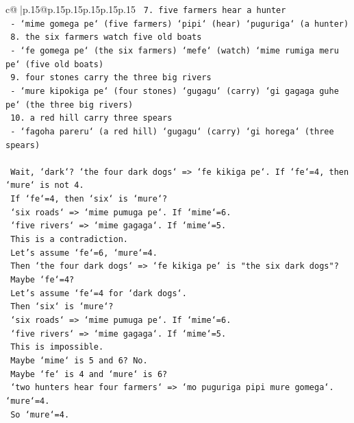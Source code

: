 \documentclass{article}
\begin{document}
{\begin{supertabular}{c@{$\;$}|p{.15\linewidth}@{}p{.15\linewidth}p{.15\linewidth}p{.15\linewidth}p{.15\linewidth}p{.15\linewidth}}
{{{\texttt{    7. five farmers hear a hunter} \\
\texttt{       {-} `mime gomega pe` (five farmers) `pipi` (hear) `puguriga` (a hunter)} \\
\texttt{    8. the six farmers watch five old boats} \\
\texttt{       {-} `fe gomega pe` (the six farmers) `mefe` (watch) `mime rumiga meru pe` (five old boats)} \\
\texttt{    9. four stones carry the three big rivers} \\
\texttt{       {-} `mure kipokiga pe` (four stones) `gugagu` (carry) `gi gagaga guhe pe` (the three big rivers)} \\
\texttt{    10. a red hill carry three spears} \\
\texttt{        {-} `fagoha pareru` (a red hill) `gugagu` (carry) `gi horega` (three spears)} \\
\\ 
\texttt{    Wait, `dark`? `the four dark dogs` => `fe kikiga pe`. If `fe`=4, then `mure` is not 4.} \\
\texttt{    If `fe`=4, then `six` is `mure`?} \\
\texttt{    `six roads` => `mime pumuga pe`. If `mime`=6.} \\
\texttt{    `five rivers` => `mime gagaga`. If `mime`=5.} \\
\texttt{    This is a contradiction.} \\
\texttt{    Let's assume `fe`=6, `mure`=4.} \\
\texttt{    Then `the four dark dogs` => `fe kikiga pe` is "the six dark dogs"?} \\
\texttt{    Maybe `fe`=4?} \\
\texttt{    Let's assume `fe`=4 for `dark dogs`.} \\
\texttt{    Then `six` is `mure`?} \\
\texttt{    `six roads` => `mime pumuga pe`. If `mime`=6.} \\
\texttt{    `five rivers` => `mime gagaga`. If `mime`=5.} \\
\texttt{    This is impossible.} \\
\texttt{    Maybe `mime` is 5 and 6? No.} \\
\texttt{    Maybe `fe` is 4 and `mure` is 6?} \\
\texttt{    `two hunters hear four farmers` => `mo puguriga pipi mure gomega`. `mure`=4.} \\
\texttt{    So `mure`=4.} \\
}}}
\end{supertabular}}
\end{document}
